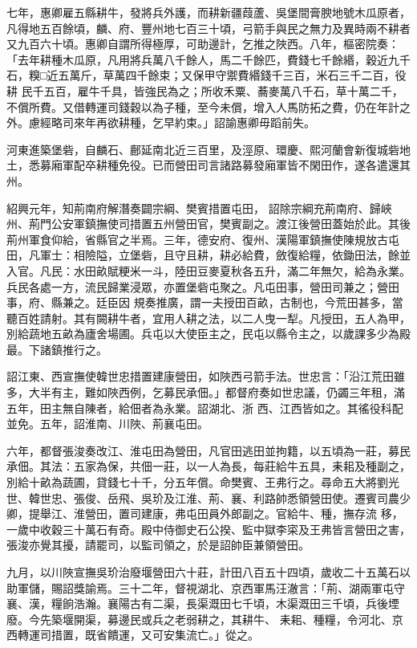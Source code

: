 \begin{pinyinscope}
 七年，惠卿雇五縣耕牛，發將兵外護，而耕新疆葭蘆、吳堡間膏腴地號木瓜原者，凡得地五百餘頃，麟、府、豐州地七百三十頃，弓箭手與民之無力及異時兩不耕者又九百六十頃。惠卿自謂所得極厚，可助邊計，乞推之陜西。八年，樞密院奏：「去年耕種木瓜原，凡用將兵萬八千餘人，馬二千餘匹，費錢七千餘緡，穀近九千石，糗□近五萬斤，草萬四千餘束；又保甲守禦費緡錢千三百，米石三千二百，役耕
 民千五百，雇牛千具，皆強民為之；所收禾粟、蕎麥萬八千石，草十萬二千，不償所費。又借轉運司錢穀以為子種，至今未償，增入人馬防拓之費，仍在年計之外。慮經略司來年再欲耕種，乞早約束。」詔諭惠卿毋蹈前失。



 河東進築堡砦，自麟石、鄜延南北近三百里，及涇原、環慶、熙河蘭會新復城砦地土，悉募廂軍配卒耕種免役。已而營田司言諸路募發廂軍皆不閑田作，遂各遣還其州。



 紹興元年，知荊南府解潛奏闢宗綱、樊賓措置屯田，
 詔除宗綱充荊南府、歸峽州、荊門公安軍鎮撫使司措置五州營田官，樊賓副之。渡江後營田蓋始於此。其後荊州軍食仰給，省縣官之半焉。三年，德安府、復州、漢陽軍鎮撫使陳規放古屯田，凡軍士：相險隘，立堡砦，且守且耕，耕必給費，斂復給糧，依鋤田法，餘並入官。凡民：水田畝賦粳米一斗，陸田豆麥夏秋各五升，滿二年無欠，給為永業。兵民各處一方，流民歸業浸眾，亦置堡砦屯聚之。凡屯田事，營田司兼之；營田事，府、縣兼之。廷臣因
 規奏推廣，謂一夫授田百畝，古制也，今荒田甚多，當聽百姓請射。其有闕耕牛者，宜用人耕之法，以二人曳一犁。凡授田，五人為甲，別給蔬地五畝為廬舍場圃。兵屯以大使臣主之，民屯以縣令主之，以歲課多少為殿最。下諸鎮推行之。



 詔江東、西宣撫使韓世忠措置建康營田，如陜西弓箭手法。世忠言：「沿江荒田雖多，大半有主，難如陜西例，乞募民承佃。」都督府奏如世忠議，仍蠲三年租，滿五年，田主無自陳者，給佃者為永業。詔湖北、浙
 西、江西皆如之。其徭役科配並免。五年，詔淮南、川陜、荊襄屯田。



 六年，都督張浚奏改江、淮屯田為營田，凡官田逃田並拘籍，以五頃為一莊，募民承佃。其法：五家為保，共佃一莊，以一人為長，每莊給牛五具，耒耜及種副之，別給十畝為蔬圃，貸錢七十千，分五年償。命樊賓、王弗行之。尋命五大將劉光世、韓世忠、張俊、岳飛、吳玠及江淮、荊、襄、利路帥悉領營田使。遷賓司農少卿，提舉江、淮營田，置司建康，弗屯田員外郎副之。官給牛、種，撫存流
 移，一歲中收穀三十萬石有奇。殿中侍御史石公揆、監中獄李寀及王弗皆言營田之害，張浚亦覺其擾，請罷司，以監司領之，於是詔帥臣兼領營田。



 九月，以川陜宣撫吳玠治廢堰營田六十莊，計田八百五十四頃，歲收二十五萬石以助軍儲，賜詔獎諭焉。三十二年，督視湖北、京西軍馬汪澈言：「荊、湖兩軍屯守襄、漢，糧餉浩瀚。襄陽古有二渠，長渠溉田七千頃，木渠溉田三千頃，兵後堙廢。今先築堰開渠，募邊民或兵之老弱耕之，其耕牛、
 耒耜、種糧，令河北、京西轉運司措置，既省饋運，又可安集流亡。」從之。




\end{pinyinscope}
